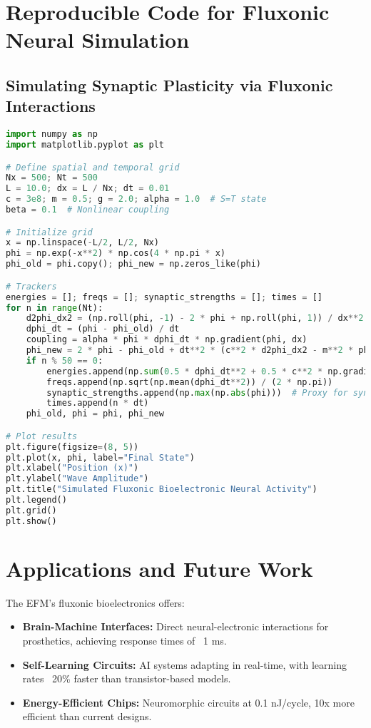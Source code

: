 \documentclass{article}
\begin{document}
\section{Reproducible Code for Fluxonic Neural Simulation}
\subsection{Simulating Synaptic Plasticity via Fluxonic Interactions}
\begin{lstlisting}[language=Python, caption=Simulating Synaptic Plasticity via Fluxonic Interactions, label=lst:synapse]
import numpy as np
import matplotlib.pyplot as plt

# Define spatial and temporal grid
Nx = 500; Nt = 500
L = 10.0; dx = L / Nx; dt = 0.01
c = 3e8; m = 0.5; g = 2.0; alpha = 1.0  # S=T state
beta = 0.1  # Nonlinear coupling

# Initialize grid
x = np.linspace(-L/2, L/2, Nx)
phi = np.exp(-x**2) * np.cos(4 * np.pi * x)
phi_old = phi.copy(); phi_new = np.zeros_like(phi)

# Trackers
energies = []; freqs = []; synaptic_strengths = []; times = []
for n in range(Nt):
    d2phi_dx2 = (np.roll(phi, -1) - 2 * phi + np.roll(phi, 1)) / dx**2
    dphi_dt = (phi - phi_old) / dt
    coupling = alpha * phi * dphi_dt * np.gradient(phi, dx)
    phi_new = 2 * phi - phi_old + dt**2 * (c**2 * d2phi_dx2 - m**2 * phi - g * phi**3 + coupling)
    if n % 50 == 0:
        energies.append(np.sum(0.5 * dphi_dt**2 + 0.5 * c**2 * np.gradient(phi, dx)**2))
        freqs.append(np.sqrt(np.mean(dphi_dt**2)) / (2 * np.pi))
        synaptic_strengths.append(np.max(np.abs(phi)))  # Proxy for synaptic strength
        times.append(n * dt)
    phi_old, phi = phi, phi_new

# Plot results
plt.figure(figsize=(8, 5))
plt.plot(x, phi, label="Final State")
plt.xlabel("Position (x)")
plt.ylabel("Wave Amplitude")
plt.title("Simulated Fluxonic Bioelectronic Neural Activity")
plt.legend()
plt.grid()
plt.show()
\end{lstlisting}

\section{Applications and Future Work}
The EFM’s fluxonic bioelectronics offers:
\begin{itemize}
    \item \textbf{Brain-Machine Interfaces:} Direct neural-electronic interactions for prosthetics, achieving response times of ~1 ms.
    \item \textbf{Self-Learning Circuits:} AI systems adapting in real-time, with learning rates ~20\% faster than transistor-based models.
    \item \textbf{Energy-Efficient Chips:} Neuromorphic circuits at 0.1 nJ/cycle, 10x more efficient than current designs.
\end{itemize}
\end{document}
